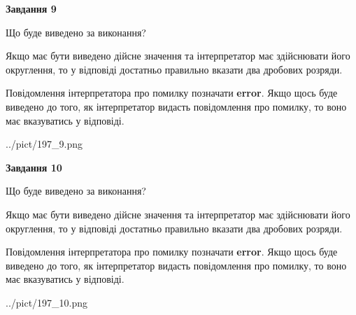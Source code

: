 \documentclass[12pt, ukrainian]{article}
\begin{document}
{\begin {Large}
{\begin {center}\textbf{Завдання 9}\end {center}}\par
Що буде виведено за виконання? \par

Якщо має бути виведено дійсне значення та інтерпретатор має здійснювати його округлення, 
то у відповіді достатньо правильно вказати два дробових розряди.

Повідомлення інтерпретатора про помилку позначати \textbf{error}.
Якщо щось буде виведено до того, як інтерпретатор видасть повідомлення про помилку, 
то воно має вказуватись у відповіді. \par

\begin{center}
	{../pict/197_9.png}
\end{center}
\newpage

{\begin {center}\textbf{Завдання 10}\end {center}}\par
Що буде виведено за виконання? \par

Якщо має бути виведено дійсне значення та інтерпретатор має здійснювати його округлення, 
то у відповіді достатньо правильно вказати два дробових розряди.

Повідомлення інтерпретатора про помилку позначати \textbf{error}.
Якщо щось буде виведено до того, як інтерпретатор видасть повідомлення про помилку, 
то воно має вказуватись у відповіді. \par

\begin{center}
	{../pict/197_10.png}
\end{center}
\newpage

\end {Large}}
\end{document}
